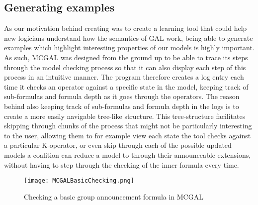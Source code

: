 \subsection{Generating examples}
As our motivation behind creating \cname was to create a learning tool that could help new logicians understand how the semantics of GAL work, being able to generate examples which highlight interesting properties of our models is highly important. As such, MCGAL was designed from the ground up to be able to trace its steps through the model checking process so that it can also display each step of this process in an intuitive manner. The program therefore creates a log entry each time it checks an operator against a specific state in the model, keeping track of sub-formulas and formula depth as it goes through the operators. The reason behind also keeping track of sub-formulas and formula depth in the logs is to create a more easily navigable tree-like structure. This tree-structure facilitates skipping through chunks of the process that might not be particularly interesting to the user, allowing them to for example view each state the tool checks against a particular K-operator, or even skip through each of the possible updated models a coalition can reduce a model to through their announceable extensions, without having to step through the checking of the inner formula every time.
 
\begin{figure}[H]
	\label{fig:basicGalChecking}
	\caption{Checking a basic group announcement formula in MCGAL}
	\texttt{[image: MCGALBasicChecking.png]}
\end{figure}

